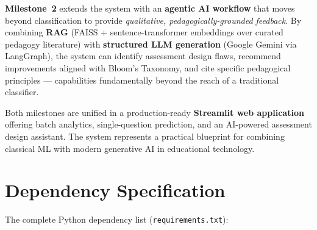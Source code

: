 \documentclass[12pt, a4paper, twoside]{article}
\newcommand{\code}[1]{\texttt{#1}}
\begin{document}
\textbf{Milestone~2} extends the system with an \textbf{agentic AI
workflow} that moves beyond classification to provide
\emph{qualitative, pedagogically-grounded feedback}. By combining
\textbf{RAG} (FAISS + sentence-transformer embeddings over curated
pedagogy literature) with \textbf{structured LLM generation} (Google
Gemini via LangGraph), the system can identify assessment design flaws,
recommend improvements aligned with Bloom's Taxonomy, and cite specific
pedagogical principles --- capabilities fundamentally beyond the reach
of a traditional classifier.

Both milestones are unified in a production-ready \textbf{Streamlit web
application} offering batch analytics, single-question prediction, and
an AI-powered assessment design assistant. The system represents a
practical blueprint for combining classical ML with modern generative
AI in educational technology.

\appendix

\section{Dependency Specification}\label{app:deps}

The complete Python dependency list (\code{requirements.txt}):
\end{document}
